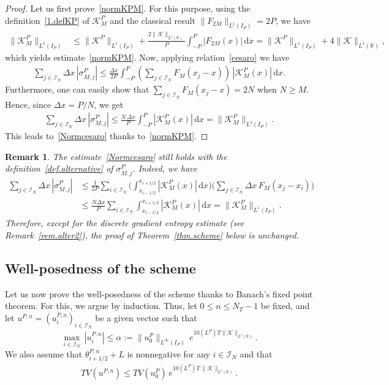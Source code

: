 \documentclass[11pt]{amsart}
\newtheorem{remark}{Remark}
\newcommand{\K}{\mathcal{K}}
\newcommand{\dd}{\mathrm{d}}
\newcommand{\R}{\mathbb{R}}
\newcommand{\I}{\mathcal{I}_N}
\begin{document}
\begin{proof}
Let us first prove~\eqref{normKPM}. For this purpose, using the definition~\eqref{1.defKP} of $\K^P_M$ and the classical result $\|F_{2M}\|_{L^1(I_P)}=2P$, we have
\begin{align*}
     \|\mathcal{K}^P_M\|_{L^1(I_P)} &\leq \|\K^P\|_{L^1(I_P)} + \frac{2\|\K\|_{L^1(\R)}}{P}\int_{-P}^P |F_{2M}(x)|\,\dd x = \|\K^P\|_{L^1(I_P)} + 4\|\K\|_{L^1(\R)},
\end{align*}
which yields estimate~\eqref{normKPM}. Now, applying relation~\eqref{cesaro} we have
\begin{align*}
    \sum_{j \in \I} \Delta x \, \left|\sigma_{M,j}^P\right| \leq \frac{\Delta x}{2P}  \int_{-P}^{P} \left( \sum_{j\in\I} F_M(x_j-x) \right)\, \left|\K^P_M(x)\right| \, \dd x.
 \end{align*}
 Furthermore, one can easily show that $\sum_{j \in \I} F_M(x_j-x) = 2N$ when $N\ge M$. Hence, since $\Delta x= P/N$, we get
 \begin{align*}
    \sum_{j \in \I} \Delta x \, \left|\sigma^P_{M,j}\right| \leq \frac{N \,\Delta x}{P}  \int_{-P}^{P} \left|\K^P_M(x)\right| \, \dd x = \|\K^P_M\|_{L^1(I_P)}.
 \end{align*}
 This leads to~\eqref{Normcesaro} thanks to~\eqref{normKPM}.
\end{proof} 

\begin{remark}\label{rem.alter1}
The estimate~\eqref{Normcesaro} still holds with the definition~\eqref{def.alternative} of $\sigma^P_{M,j}$. Indeed, we have
\begin{align*}
\sum_{j \in \I} \Delta x \, \left|\sigma_{M,j}^P\right| &\leq \frac{1}{2P} \sum_{i \in \I} \Bigg(\int_{x_{i-1/2}}^{x_{i+1/2}} |\K^P_M(x)| \, \dd x \Bigg)  \Bigg(\sum_{j \in \I} \Delta x \, F_M(x_j-x_i) \Bigg)\\
&\leq \frac{N \Delta x}{P} \sum_{i \in \I} \int_{x_{i-1/2}}^{x_{i+1/2}} |\K^P_M(x)| \, \dd x = \|\K^P_M\|_{L^1(I_P)}.
\end{align*}
Therefore, except for the discrete gradient entropy estimate (see Remark~\ref{rem.alter2}), the proof of Theorem~\ref{thm.scheme} below is unchanged.
\end{remark}

\subsection{Well-posedness of the scheme}\label{sec.wellpos}

Let us now prove the well-posedness of the scheme thanks to Banach's fixed point theorem. For this, we argue by induction. Thus, let $0\leq n \leq N_T-1$ be fixed, and let $u^{P,n} = (u^{P,n}_i)_{i\in\I}$ be a given vector such that 
\[
\max_{i\in\I}\, |u^{P,n}_i| \leq \alpha := \|u^P_0\|_{L^\infty(I_P)} \, e^{10 (L^P)T \|\mathcal{K}\|_{L^1(\mathbb{R})}}.
\]
We also assume that $\theta^{P,n}_{i+1/2}+L$ is nonnegative for any $i\in \I$ and that
\begin{align*}%
    TV\left( u^{P,n}\right) \leq TV\left(u^P_0\right) \, e^{10 (L^P)T \, \|\K\|_{L^1(\R)}}.
\end{align*}
\end{document}
